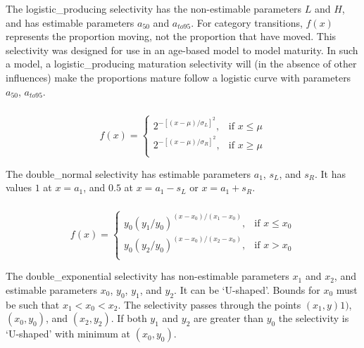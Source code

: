 The logistic\_producing selectivity has the non-estimable parameters $L$ and $H$, and has estimable parameters $a_{50}$ and $a_{to95}$. For category transitions, $f(x)$ represents the proportion moving, not the proportion that have moved. This selectivity was designed for use in an age-based model to model maturity. In such a model, a logistic\_producing maturation selectivity will (in the absence of other influences) make the proportions mature follow a logistic curve with parameters $a_{50}$, $a_{to95}$.

\subsubsection*{}

\begin{equation}
  f(x) = \begin{cases}
    2^{-[(x- \mu)/\sigma_L ]^2}, & \text{if $x \leq \mu$} \\
    2^{-[(x- \mu)/\sigma_R ]^2}, & \text{if $x \ge \mu$}\\
  \end{cases}
\end{equation} 

The double\_normal selectivity has estimable parameters $a_1$, $s_L$, and $s_R$. It has values $1$ at $x=a_1$, and $0.5$ at $x=a_1-s_L$ or $x=a_1+s_R$. 

\subsubsection*{}

\begin{equation} 
f(x)=\begin{cases}
	  y_0(y_1 / y_0)^{(x-x_0)/(x_1-x_0)}, & \text{if $x \le x_0$} \\
	  y_0(y_2 / y_0)^{(x-x_0)/(x_2-x_0)}, & \text{if $x > x_0$} \\
  \end{cases}
\end{equation}

The double\_exponential selectivity has non-estimable parameters $x_1$ and $x_2$, and estimable parameters $x_0$, $y_0$, $y_1$, and $y_2$. It can be `U-shaped'. Bounds for $x_0$ must be such that $x_1 < x_0 < x_2$. The selectivity passes through the points $(x_1, y)1)$, $(x_0, y_0)$, and $(x_2, y_2)$. If both $y_1$ and $y_2$ are greater than $y_0$ the selectivity is `U-shaped' with minimum at $(x_0, y_0)$.

